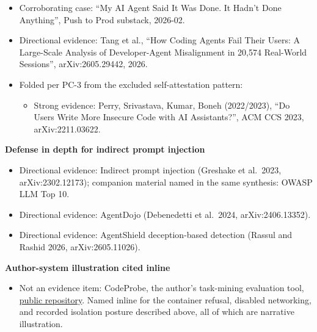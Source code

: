 \begin{itemize}
\tightlist
\item
  Corroborating case: ``My AI Agent Said It Was Done. It Hadn't Done Anything'', Push to Prod substack, 2026-02.
\item
  Directional evidence: Tang et al., ``How Coding Agents Fail Their Users: A Large-Scale Analysis of Developer-Agent Misalignment in 20,574 Real-World Sessions'', arXiv:2605.29442, 2026.
\item
  Folded per PC-3 from the excluded self-attestation pattern:

  \begin{itemize}
  \tightlist
  \item
    Strong evidence: Perry, Srivastava, Kumar, Boneh (2022/2023), ``Do Users Write More Insecure Code with AI Assistants?'', ACM CCS 2023, arXiv:2211.03622.
  \end{itemize}
\end{itemize}

\textbf{Defense in depth for indirect prompt injection}

\begin{itemize}
\tightlist
\item
  Directional evidence: Indirect prompt injection (Greshake et al.~2023, arXiv:2302.12173); companion material named in the same synthesis: OWASP LLM Top 10.
\item
  Directional evidence: AgentDojo (Debenedetti et al.~2024, arXiv:2406.13352).
\item
  Directional evidence: AgentShield deception-based detection (Rassul and Rashid 2026, arXiv:2605.11026).
\end{itemize}

\textbf{Author-system illustration cited inline}

\begin{itemize}
\tightlist
\item
  Not an evidence item: CodeProbe, the author's task-mining evaluation tool, \href{https://github.com/sjarmak/codeprobe}{public repository}. Named inline for the container refusal, disabled networking, and recorded isolation posture described above, all of which are narrative illustration.
\end{itemize}

